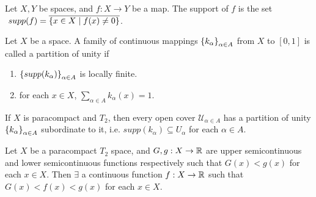 \begin{df}
    Let $X, Y$ be spaces, and $f: X\to Y$ be a map. The support of $f$ is the set $~supp (f) = \overline{{\left\{{x\in X \mid f(x) \neq 0}\right\}}}$.
\end{df}

\begin{df}
    Let $X$ be a space. A family of continuous mappings ${\left\{{k_\alpha}\right\}}_{\alpha\in A}$ from $X$ to $[0, 1]$ is called a partition of unity if
    \begin{enumerate}[label={(\roman*)}]
        \item ${\left\{{supp(k_\alpha)}\right\}}_{\alpha\in A}$ is locally finite.
        \item for each $x\in X$, $\sum_{\alpha\in A} k_\alpha(x) = 1$.
    \end{enumerate}
\end{df}

\begin{thm}
    If $X$ is paracompact and $T_2$, then every open cover $\mathcal U_{\alpha\in A}$ has a partition of unity ${\left\{{k_\alpha}\right\}}_{\alpha\in A}$ subordinate to it, i.e. $supp(k_\alpha) \subseteq U_\alpha$ for each $\alpha\in A$.
\end{thm}

\begin{prop}
    Let $X$ be a paracompact $T_2$ space, and $G, g: X \to {\mathbb R}$ are upper semicontinuous and lower semicontinuous functions respectively such that $G(x) < g(x)$ for each $x\in X$. Then $\exists$ a continuous function $f: X\to {\mathbb R}$ such that $G(x) < f(x) < g(x)$ for each $x\in X$.
\end{prop}